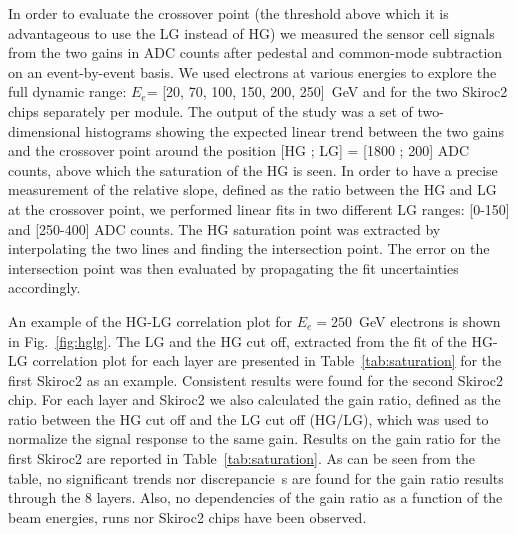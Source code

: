 In order to evaluate the crossover point (the threshold above which it is advantageous to use the LG instead of HG) we measured the sensor 
cell signals from the two gains in ADC counts after pedestal and common-mode subtraction on an event-by-event basis. We used electrons at 
various energies to explore the full
dynamic range: $E_{e}$= [20, 70, 100, 150, 200, 250]~GeV and for the two Skiroc2 chips separately per module. The output
of the study was a set of two-dimensional histograms showing the expected linear trend between the two gains and the crossover point around
the position [HG ; LG] = [1800 ; 200] ADC counts, above which the saturation of the HG is seen. In order to have a precise
measurement of the relative slope, defined as the ratio between the HG and LG at the crossover point, we performed linear fits in
two different LG ranges: [0-150] and [250-400] ADC counts. The HG saturation point was extracted by interpolating the two lines and finding
the intersection point. The error on the intersection point was then evaluated by propagating the fit uncertainties accordingly.

An example of the HG-LG correlation plot for  $E_{e}=250$~GeV electrons is shown in Fig.~\ref{fig:hglg}. The LG and the HG cut off, extracted
from the fit of the HG-LG correlation plot for each layer are presented in Table~\ref{tab:saturation} for the first Skiroc2 as an example.
Consistent results were found for the second Skiroc2 chip. For each layer and Skiroc2 we also calculated the gain ratio, defined as the ratio
between the HG cut off and the LG cut off (HG/LG), which was used to normalize the signal response to the same gain. Results on the gain
ratio for the first Skiroc2 are reported in Table~\ref{tab:saturation}. As can be seen from the table, no significant trends nor discrepancie\
s
are found for the gain ratio results through the 8 layers.
Also, no dependencies of the gain ratio as a function of the beam energies, runs nor Skiroc2 chips have been observed.


